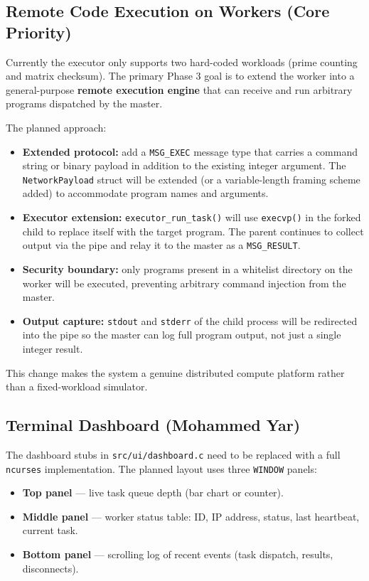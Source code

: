 \documentclass[12pt,a4paper]{article}
\begin{document}
\subsection{Remote Code Execution on Workers (Core Priority)}

Currently the executor only supports two hard-coded workloads (prime counting and matrix
checksum). The primary Phase 3 goal is to extend the worker into a general-purpose
\textbf{remote execution engine} that can receive and run arbitrary programs dispatched
by the master.

The planned approach:
\begin{itemize}[noitemsep]
    \item \textbf{Extended protocol:} add a \texttt{MSG\_EXEC} message type that carries a
          command string or binary payload in addition to the existing integer argument.
          The \texttt{NetworkPayload} struct will be extended (or a variable-length framing
          scheme added) to accommodate program names and arguments.
    \item \textbf{Executor extension:} \texttt{executor\_run\_task()} will use \texttt{execvp()}
          in the forked child to replace itself with the target program. The parent continues
          to collect output via the pipe and relay it to the master as a \texttt{MSG\_RESULT}.
    \item \textbf{Security boundary:} only programs present in a whitelist directory on the
          worker will be executed, preventing arbitrary command injection from the master.
    \item \textbf{Output capture:} \texttt{stdout} and \texttt{stderr} of the child process
          will be redirected into the pipe so the master can log full program output, not just
          a single integer result.
\end{itemize}

This change makes the system a genuine distributed compute platform rather than a
fixed-workload simulator.

\subsection{Terminal Dashboard (Mohammed Yar)}

The dashboard stubs in \texttt{src/ui/dashboard.c} need to be replaced with a full
\texttt{ncurses} implementation. The planned layout uses three \texttt{WINDOW} panels:

\begin{itemize}[noitemsep]
    \item \textbf{Top panel} --- live task queue depth (bar chart or counter).
    \item \textbf{Middle panel} --- worker status table: ID, IP address, status, last heartbeat, current task.
    \item \textbf{Bottom panel} --- scrolling log of recent events (task dispatch, results, disconnects).
\end{itemize}
\end{document}
